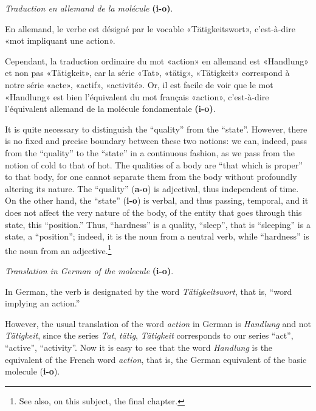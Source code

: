 \begin{sloppypar}
{    {\small
      \begin{center}
        \emph{Traduction en allemand de la molécule} \textbf{(i-o)}.
      \end{center}


      En allemand, le verbe est désigné par le vocable
      «Tätigkeitswort», c’est-à-dire «mot impliquant une action».

      Cependant, la traduction ordinaire du mot «action» en allemand
      est «Handlung» et non pas «Tätigkeit», car la série «Tat»,
      «tätig», «Tätigkeit» correspond à notre série «acte»,
      «actif», «activité». Or, il est facile de voir que le mot
      «Handlung» est bien l’équivalent du mot français «action»,
      c’est-à-dire l’équivalent allemand de la molécule fondamentale
      \textbf{(i-o)}.}

  }
  {It is quite necessary to distinguish the ``quality'' from the
    ``state''. However, there is no fixed and precise boundary between
    these two notions: we can, indeed, pass from the ``quality'' to
    the ``state'' in a continuous fashion, as we pass from the notion
    of cold to that of hot. The qualities of a body are ``that which
    is proper'' to that body, for one cannot separate them from the
    body without profoundly altering its nature. The ``quality''
    (\textbf{a-o}) is adjectival, thus independent of time. On the
    other hand, the ``state'' (\textbf{i-o}) is verbal, and thus
    passing, temporal, and it does not affect the very nature of the
    body, of the entity that goes through this state, this
    ``position.'' Thus, ``hardness'' is a quality, ``sleep'', that is
    ``sleeping'' is a state, a ``position''; indeed, it is the noun
    from a neutral verb, while ``hardness'' is the noun from an
    adjective.\footnote{See also, on this subject, the final chapter.}

    {\small
      \begin{center}
        \emph{Translation in German of the molecule} \textbf{(i-o)}.
      \end{center}

      In German, the verb is designated by the word
      \emph{Tätigkeitswort}, that is, ``word implying an action.''

      However, the usual translation of the word \emph{action} in
      German is \emph{Handlung} and not \emph{Tätigkeit}, since the
      series \emph{Tat}, \emph{tätig}, \emph{Tätigkeit} corresponds to
      our series ``act'', ``active'', ``activity''. Now it is easy to
      see that the word \emph{Handlung} is the equivalent of the
      French word \emph{action}, that is, the German equivalent of the
      basic molecule (\textbf{i-o}).  } }


\end{sloppypar}
